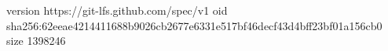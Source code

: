 version https://git-lfs.github.com/spec/v1
oid sha256:62eeae4214411688b9026cb2677e6331e517bf46decf43d4bff23bf01a156cb0
size 1398246
